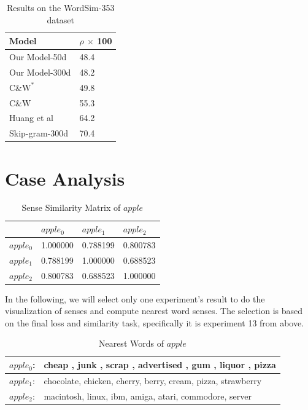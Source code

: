 \begin{table}
\caption{Results on the WordSim-353 dataset} \label{tab:word353} 
\begin{center}
\begin{tabular}{|l|l|}
\hline
Model & $\rho$ $\times$ 100 \\ 
\hline
Our Model-50d &  48.4 \\
\hline
Our Model-300d & 48.2	\\ 
\hline
$\mathrm{C}\&\mathrm{W}^*$  	& 49.8\\ 
\hline
$\mathrm{C}\&\mathrm{W}$ 	& 55.3\\ 
\hline
Huang et al 	& 64.2\\ 
\hline
Skip-gram-300d  	& 70.4\\ 
\hline
\end{tabular}
\end{center}
\end{table}
 
 



 
\section{Case Analysis}

\begin{table}[tb]
	\caption{Sense Similarity Matrix of $apple$} \label{tab:sensematrixapple} 
	\begin{center} \begin{tabular}{|l|l|l|l|}  
			\hline
			& $apple_0$ & $apple_1$ & $apple_2$ \\ 
			\hline  
			$apple_0$  & 1.000000  & 0.788199 & 0.800783 \\ 
			\hline 
			$apple_1$  & 0.788199 & 1.000000 & 0.688523  \\ 
			\hline 
			$apple_2$  & 0.800783 & 0.688523 & 1.000000  \\
			\hline
		\end{tabular} 
	\end{center}
\end{table}
In the following, we will select only one experiment's result to do the visualization of senses and compute nearest word senses. The selection is based on the final loss and similarity task, specifically it is experiment 13 from above.   

\begin{table}[tb]
	
	\caption{Nearest Words of $apple$} \label{tab:nearestapple} 
	\begin{center} \begin{tabular}{|l|l|}  
			\hline 
			$apple_0$: & cheap , junk , scrap , advertised , gum , liquor , pizza   \\  
			\hline
			$apple_1$: & chocolate, chicken, cherry, berry, cream, pizza, strawberry  \\  
			\hline
			$apple_2$: & macintosh, linux, ibm, amiga, atari, commodore, server   \\  
			\hline
		\end{tabular}
	\end{center}
\end{table}

